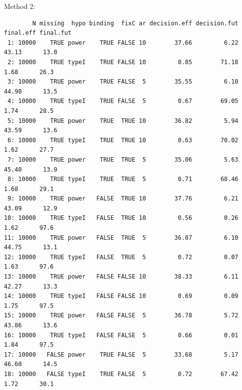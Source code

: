 \documentclass[12pt]{article}
\begin{document}
Method 2:
\begin{verbatim}
        N missing  hypo binding  fixC ar decision.eff decision.fut final.eff final.fut
 1: 10000    TRUE power    TRUE FALSE 10        37.66         6.22     43.13      13.0
 2: 10000    TRUE typeI    TRUE FALSE 10         0.85        71.18      1.68      26.3
 3: 10000    TRUE power    TRUE FALSE  5        35.55         6.10     44.90      13.5
 4: 10000    TRUE typeI    TRUE FALSE  5         0.67        69.05      1.74      28.5
 5: 10000    TRUE power    TRUE  TRUE 10        36.82         5.94     43.59      13.6
 6: 10000    TRUE typeI    TRUE  TRUE 10         0.63        70.02      1.62      27.7
 7: 10000    TRUE power    TRUE  TRUE  5        35.06         5.63     45.40      13.9
 8: 10000    TRUE typeI    TRUE  TRUE  5         0.71        68.46      1.68      29.1
 9: 10000    TRUE power   FALSE  TRUE 10        37.76         6.21     43.09      12.9
10: 10000    TRUE typeI   FALSE  TRUE 10         0.56         0.26      1.62      97.6
11: 10000    TRUE power   FALSE  TRUE  5        36.07         6.10     44.75      13.1
12: 10000    TRUE typeI   FALSE  TRUE  5         0.72         0.07      1.63      97.6
13: 10000    TRUE power   FALSE FALSE 10        38.33         6.11     42.27      13.3
14: 10000    TRUE typeI   FALSE FALSE 10         0.69         0.09      1.75      97.5
15: 10000    TRUE power   FALSE FALSE  5        36.78         5.72     43.86      13.6
16: 10000    TRUE typeI   FALSE FALSE  5         0.66         0.01      1.84      97.5
17: 10000   FALSE power    TRUE FALSE  5        33.68         5.17     46.60      14.5
18: 10000   FALSE typeI    TRUE FALSE  5         0.72        67.42      1.72      30.1
\end{verbatim}

\clearpage
\end{document}
